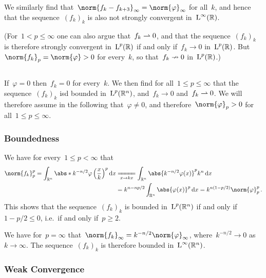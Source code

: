We similarly find that~$\norm{f_k - f_{k+3}}_\infty = \norm{\varphi}_\infty$ for all~$k$, and hence that the sequence~$(f_k)_k$ is also not strongly convergent in~$\operatorname{L}^\infty(\mathbb{R})$.

(For~$1 < p \leq \infty$ one can also argue that~$f_k \rightharpoonup 0$, and that the sequence~$(f_k)_k$ is therefore strongly convergent in~$\operatorname{L}^p(\mathbb{R})$ if and only if~$f_k \to 0$ in~$\operatorname{L}^p(\mathbb{R})$.
But~$\norm{f_k}_p = \norm{\varphi} > 0$ for every~$k$, so that~$f_k \nrightarrow 0$ in~$\operatorname{L}^p(\mathbb{R})$.)




\subsection{}

If~$\varphi = 0$ then~$f_k = 0$ for every~$k$.
We then find for all~$1 \leq p \leq \infty$ that the sequence~$(f_k)_k$ isd bounded in~$\operatorname{L}^p(\mathbb{R}^n)$, and~$f_k \to 0$ and~$f_k \rightharpoonup 0$.
We will therefore assume in the following that~$\varphi \neq 0$, and therefore~$\norm{\varphi}_p > 0$ for all~$1 \leq p \leq \infty$.



\subsubsection{Boundedness}

We have for every~$1 \leq p < \infty$ that
\begin{align*}
  \norm{f_k}_p^p
  =
  \int_{\Real^n} \abs*{ k^{-n/2} \varphi\left( \frac{x}{k} \right) }^p \dd{x}
  &\xlongequal[x \to kx]{}
  \int_{\Real^n} \abs{ k^{-n/2} \varphi(x) }^p k^n \dd{x}  \\
  &=
  k^{n - np/2} \int_{\Real^n} \abs{\varphi(x)}^p \dd{x}
  =
  k^{n(1 - p/2)} \norm{\varphi}_p^p \,.
\end{align*}
This shows that the sequence~$(f_k)_k$ is bounded in~$\operatorname{L}^p(\mathbb{R}^n)$ if and only if~$1-p/2 \leq 0$, i.e.\ if and only if~$p \geq 2$.

We have for~$p = \infty$ that~$\norm{f_k}_\infty = k^{-n/2} \norm{\varphi}_{\infty}$, where~$k^{-n/2} \to 0$ as~$k \to \infty$.
The sequence~$(f_k)_k$ is therefore bounded in~$\operatorname{L}^\infty(\mathbb{R}^n)$.



\subsubsection{Weak Convergence}

